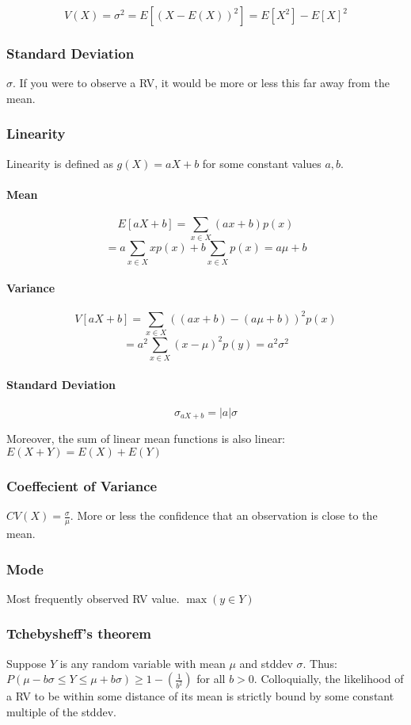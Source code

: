 \documentclass[a4paper]{article}
\begin{document}
\[V(X)=\sigma^2=E[(X-E(X))^2]=E[X^2]-E[X]^2\]

\subsubsection{Standard Deviation}
$\sigma$. If you were to observe a RV, it would be more or less this far away from the mean.

\subsubsection{Linearity}
Linearity is defined as $g(X)=aX+b$ for some constant values $a,b$.

\paragraph{Mean}
\[E[aX+b]=\sum_{x\in X} (ax + b)p(x)\]
\[=a\sum_{x\in X} xp(x)+b\sum_{x\in X} p(x)=a\mu+b\]

\paragraph{Variance}
\[V[aX+b]=\sum_{x\in X} \left( (ax+b) - (a\mu + b) \right)^2 p(x)\]
\[=a^2\sum_{x\in X} (x-\mu)^2 p(y) = a^2\sigma^2 \]

\paragraph{Standard Deviation}
\[\sigma_{aX+b}=|a|\sigma\]

Moreover, the sum of linear mean functions is also linear: $E(X + Y)=E(X) + E(Y)$

\subsubsection{Coeffecient of Variance}
$CV(X)=\frac{\sigma}{\mu}$. More or less the confidence that an observation is close to the mean.

\subsubsection{Mode}
Most frequently observed RV value. $\max(y\in Y)$

\subsubsection{Tchebysheff's theorem}
Suppose $Y$ is any random variable with mean $\mu$ and stddev $\sigma$. Thus: $P(\mu-b\sigma\le Y\le \mu+b\sigma)\ge 1-(\frac{1}{b^2})$ for all $b > 0$. Colloquially, the likelihood of a RV to be within some distance of its mean is strictly bound by some constant multiple of the stddev.
\end{document}
